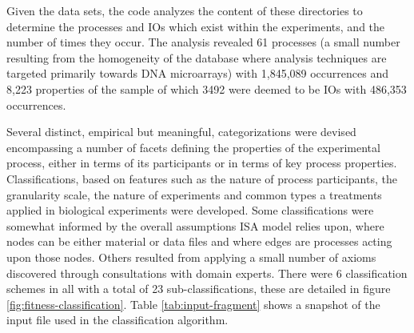 Given the data sets, the code analyzes the content of these directories to determine the processes and IOs which exist within the experiments, and the number of times they occur. The analysis revealed 61 processes (a small number resulting from the homogeneity of the database where analysis techniques are targeted primarily towards DNA microarrays) with 1,845,089 occurrences and 8,223 properties of the sample of which 3492 were deemed to be IOs with 486,353 occurrences.

Several distinct, empirical but meaningful, categorizations were devised encompassing a number of facets defining the properties of the experimental process, either in terms of its participants or in terms of key process properties. Classifications, based on features such as the nature of process participants, the granularity scale, the nature of experiments and common types a treatments applied in biological experiments were developed. Some classifications were somewhat informed by the overall assumptions ISA model relies upon, where nodes can be either material or data files and where edges are processes acting upon those nodes. Others resulted from applying a small number of axioms discovered through consultations with domain experts. There were 6 classification schemes in all with a total of 23 sub-classifications, these are detailed in figure \ref{fig:fitness-classification}. Table \ref{tab:input-fragment} shows a snapshot of the input file used in the classification algorithm.

